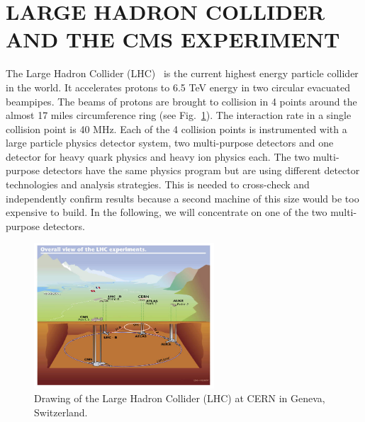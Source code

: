 \documentclass{wscpaperproc}
\theoremstyle{wsc}
\begin{document}
\section{LARGE HADRON COLLIDER AND THE CMS EXPERIMENT}
\label{sec:lhc}

The Large Hadron Collider (LHC)~ is the current highest energy particle collider in the world. It accelerates protons to 6.5 TeV energy in two circular evacuated beampipes. The beams of protons are brought to collision in 4 points around the almost 17 miles circumference ring (see Fig.~\ref{fig:lhc}). The interaction rate in a single collision point is 40 MHz. Each of the 4 collision points is instrumented with a large particle physics detector system, two multi-purpose detectors and one detector for heavy quark physics and heavy ion physics each. The two multi-purpose detectors have the same physics program but are using different detector technologies and analysis strategies. This is needed to cross-check and independently confirm results because a second machine of this size would be too expensive to build. In the following, we will concentrate on one of the two multi-purpose detectors.

\begin{figure}[htb]
{
   \centering
   \includegraphics[width=0.60\textwidth]{lhc}
   \caption{Drawing of the Large Hadron Collider (LHC) at CERN in Geneva, Switzerland.
   \label{fig:lhc}}
}
\end{figure}
\end{document}
